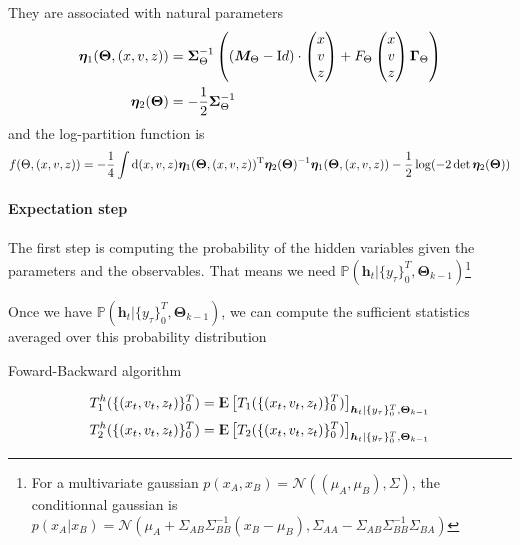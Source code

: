 \documentclass{article}
\numberwithin{equation}{section} %
\newcommand{\f}[2]{\mathchoice%
			{\dfrac{#1}{#2}}
	    	{\dfrac{#1}{#2}}
			{\frac{#1}{#2}}
			{\frac{#1}{#2}}}
\newcommand{\Id}{{\textrm Id}}
\newcommand{\expec}[1]{\ensuremath{{\rm I\kern-.3em \rm E}\left[#1\right]}}
\newcommand{\prob}[1]{\ensuremath{\mathbb{P}\left(#1\right)}}
\renewcommand{\rm}[1]{\mathrm{#1}}%
\newcommand{\T}{\rm{T}}
\newcommand{\1}{\mathds{1}} %
\newcommand{\dd}{\mathrm{d}} %
\begin{document}
They are associated with natural parameters
\begin{align}
    \label{eq:naturals_parameters}
    \bm{\eta}_1(\bm{\Theta},(x,v,z)) &= \bm{\Sigma}_{\Theta}^{-1}\left( (\bm{M}_{\Theta}-\Id)\cdot\begin{pmatrix}
    x \\ v \\ z
    \end{pmatrix} + F_{\Theta}\begin{pmatrix}
    x \\ v \\ z
    \end{pmatrix} \bm{\Gamma}_{\Theta}\right) \\
    \bm{\eta}_2(\bm{\Theta}) &= -\f{1}{2} \bm{\Sigma}_{\Theta}^{-1}
\end{align}
and the log-partition function is
\begin{equation}
    \label{eq:log-partion-exp-family}
    f(\Theta,(x,v,z)) = -\f{1}{4} \int \dd (x,v,z) \bm{\eta}_1(\bm{\Theta},(x,v,z))^\T \bm{\eta}_2(\bm{\Theta})^{-1} \bm{\eta}_1(\bm{\Theta},(x,v,z)) -\f{1}{2} \log( -2 \det \bm{\eta}_2(\bm{\Theta}))
\end{equation}

\paragraph{Expectation step}
The first step is computing the probability of the hidden variables given the parameters and the observables. That means we need $\prob{ \bm{h}_t | \{y_\tau\}_0^T, \bm{\Theta}_{k-1}}$\footnote{For a multivariate gaussian $p(x_A,x_B)=\mathcal{N}((\mu_A,\mu_B),\Sigma)$,  the conditionnal gaussian is $p(x_A|x_B)= \mathcal{N}(\mu_A+\Sigma_{AB}\Sigma_{BB}^{-1}(x_B-\mu_B),\Sigma_{AA}-\Sigma_{AB}\Sigma_{BB}^{-1}\Sigma_{BA})$}

Once we have $\prob{ \bm{h}_t | \{y_\tau\}_0^T, \bm{\Theta}_{k-1}}$, we can compute the sufficient statistics averaged over this probability distribution

Foward-Backward algorithm

\begin{align}
    \label{eq:sufficient_stats_avg}
    T^h_1(\{(x_t,v_t,z_t) \}_0^T) &=  \expec{ T_1(\{(x_t,v_t,z_t) \}_0^T)}_{\bm{h}_t | \{y_\tau\}_0^T, \bm{\Theta}_{k-1}} \\
      T^h_2(\{(x_t,v_t,z_t) \}_0^T) &=  \expec{ T_2(\{(x_t,v_t,z_t) \}_0^T)}_{\bm{h}_t | \{y_\tau\}_0^T, \bm{\Theta}_{k-1}} 
\end{align}
\end{document}
